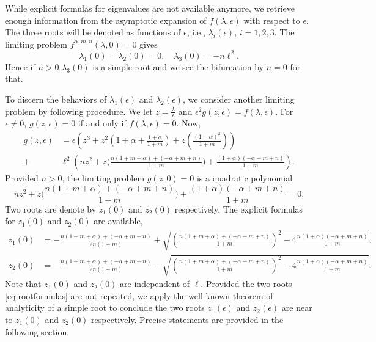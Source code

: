 \documentclass[a4paper,11pt]{article}
\def\l{{\ell}}
\theoremstyle{remark}
\begin{document}
While explicit formulas for eigenvalues are not available anymore, we retrieve enough information from the asymptotic expansion of $f(\lambda,\epsilon)$ with respect to $\epsilon$. The three roots will be denoted as functions of $\epsilon$, i.e., $\lambda_i(\epsilon)$, $i=1,2,3$. The limiting problem $f^{\alpha,m,n}(\lambda,0)=0$ gives
$$ \lambda_1(0)=\lambda_2(0)=0, \quad \lambda_3(0) = -n\l^2.$$
Hence if $n>0$ $\lambda_3(0)$ is a simple root and we see the bifurcation by $n=0$ for that.

To discern the behaviors of $\lambda_1(\epsilon)$ and $\lambda_2(\epsilon)$, we consider another limiting problem by following procedure.
We let $z = \frac{\lambda}{\epsilon}$ and $\epsilon^2 g(z,\epsilon) =  f(\lambda, \epsilon)$. For $\epsilon\ne0$, $g(z,\epsilon)=0$ if and only if $f(\lambda,\epsilon)=0$. Now,
\begin{align}
 g(z,\epsilon) &= \epsilon\left( z^3 + z^2\left(1+\alpha + \tfrac{1+\alpha}{1+m}\right) + z\left(\tfrac{(1+\alpha)^2}{1+m}\right)\right) \nonumber\\
 +& \l^2\left(nz^2 + z\Big( \tfrac{n(1+m+\alpha) + (-\alpha+m+n)}{1+m}\Big) + \tfrac{(1+\alpha)(-\alpha+m+n)}{1+m}  \right). \label{eq:reduced_poly}
\end{align}
Provided $n>0$, the limiting problem $g(z,0)=0$ is a quadratic polynomial
\begin{equation}
nz^2 + z\Big( \frac{n(1+m+\alpha) + (-\alpha+m+n)}{1+m}\Big) + \frac{(1+\alpha)(-\alpha+m+n)}{1+m} =0. \label{eq:auxquad}
\end{equation}
Two roots are  denote by $z_1(0)$ and $z_2(0)$ respectively.  The explicit formulas for $z_1(0)$ and $z_2(0)$ are available,
\begin{equation}\label{eq:rootformulas}
\begin{aligned}
 z_1(0) &= -\tfrac{n(1+m+\alpha) + (-\alpha+m+n)}{2n(1+m)} + \sqrt{\left(\tfrac{n(1+m+\alpha) + (-\alpha+m+n)}{1+m}\right)^2 -4 \tfrac{n(1+\alpha)(-\alpha+m+n)}{1+m}},\\
z_2(0) &= -\tfrac{n(1+m+\alpha) + (-\alpha+m+n)}{2n(1+m)}  - \sqrt{\left(\tfrac{n(1+m+\alpha) + (-\alpha+m+n)}{1+m}\right)^2 -4 \tfrac{n(1+\alpha)(-\alpha+m+n)}{1+m}}.
\end{aligned}
\end{equation}
Note that $z_1(0)$ and $z_2(0)$ are independent of $\ell$. Provided the two roots  \eqref{eq:rootformulas} are not repeated, we apply the well-known theorem of analyticity of a simple root to conclude the two roots $z_1(\epsilon)$ and $z_2(\epsilon)$ are near to $z_1(0)$ and $z_2(0)$ respectively. Precise statements are provided in the following section.
\end{document}
